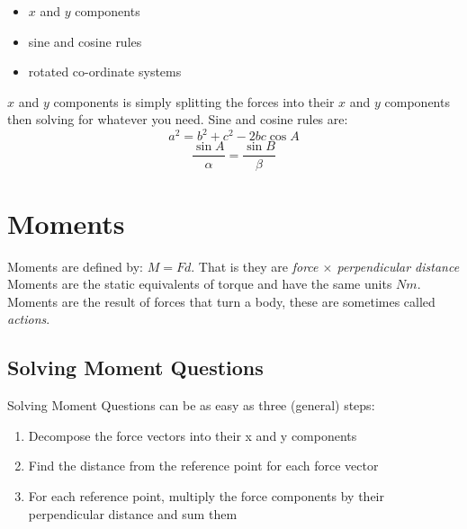 \documentclass[a4paper, 12pt]{article}
\begin{document}
\begin{itemize}
    \item $x$ and $y$ components 
    \item sine and cosine rules
    \item rotated co-ordinate systems
\end{itemize}

$x$ and $y$ components is simply splitting the forces into their $x$ and $y$ components then solving
for whatever you need. Sine and cosine rules are:
\begin{equation*}
    a^2 = b^2 + c^2 - 2bc\cos{A} 
\end{equation*}
\begin{equation*}
    \frac{\sin{A}}{\alpha} = \frac{\sin{B}}{\beta} 
\end{equation*}


\section{Moments}
Moments are defined by: $M=Fd$.
That is they are \textit{force $\times$ perpendicular distance}
Moments are the static equivalents of torque and have the same units $Nm$.
Moments are the result of forces that turn a body, these are sometimes called \textit{actions}.
\subsection{Solving Moment Questions}
Solving Moment Questions can be as easy as three (general) steps:
\begin{enumerate}
    \item Decompose the force vectors into their x and y components 
    \item Find the distance from the reference point for each force vector
    \item For each reference point, multiply the force components by their perpendicular distance and sum them 
\end{enumerate}
\newpage
\end{document}
